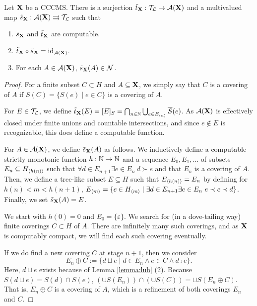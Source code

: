 \documentclass{eptcs-modified}
\begin{document}
\begin{proposition}\label{prop:nicefunctionsgeneral}
Let $\mathbf{X}$ be a CCCMS.
There is a surjection $\tilde{t}_{\mathbf{X}} : \mathcal{T}_\mathcal{L} \to {\mathcal{A}}(\mathbf{X})$ and a multivalued map $\tilde{s}_{\mathbf{X}}: {\mathcal{A}}(\mathbf{X}) \rightrightarrows \mathcal{T}_\mathcal{L}$ such that
\begin{enumerate}
\item $\tilde{s}_{\mathbf{X}}$ and $\tilde{t}_{\mathbf{X}}$ are computable.
\item $\tilde{t}_{\mathbf{X}} \circ \tilde{s}_{\mathbf{X}} = \textnormal{id}_{\mathcal{A}(\mathbf{X})}$.
\item For each $A \in {\mathcal{A}}(\mathbf{X})$, $\tilde{s}_{\mathbf{X}}(A) \in \mathcal{N}$.
\end{enumerate}

\begin{proof}
For a finite subset $C \subset H$ and $A \subseteq \mathbf{X}$, we simply say that $C$ is a covering of $A$ if
$S(C) = \{S(e) \mid e \in C\}$ is a covering of $A$.

For $E \in \mathcal{T}_\mathcal{L}$, we define $\tilde{t}_{\mathbf{X}}(E) = [E]_S =
\bigcap_{n \in \mathbb{N}} \bigcup_{e \in {{E_{{\langle n\rangle}}}}} \overline{S}(e)$.
As $\mathcal{A}(\mathbf{X})$ is effectively closed under finite unions and countable intersections,
and since $e \notin E$ is recognizable, this does define a computable function.

For $A \in \mathcal{A}(\mathbf{X})$, we define $\tilde{s}_{\mathbf{X}}(A)$ as follows.
We inductively define a computable strictly monotonic function $h : \mathbb{N} \to \mathbb{N}$ and
a sequence $E_0,E_1,\ldots$ of subsets $E_n \subseteq {{H_{{\langle h(n)\rangle}}}}$ such that
$\forall d \in E_{n+1} \exists  e \in E_{n} \ d \succ e $ and that
$E_n$ is a covering of $A$.
Then, we define a tree-like subset $E \subseteq H$ such that
${{E_{{\langle h(n)\rangle}}}} = E_n$ by defining for $h(n) < m < h(n+1)$,
${{E_{{\langle m\rangle}}}} =
\{c \in {{H_{{\langle m\rangle}}}} \mid \exists d \in E_{n+1} \exists  e \in E_{n} \ e \prec c \prec d\}$. Finally, we set $\tilde{s}_{\mathbf{X}}(A) = E$.



We start with $h(0) = 0$ and $E_0 = \{\varepsilon\}$.
We search for (in a dove-tailing way) finite coverings $C \subset H$ of $A$.
There are infinitely many such coverings, and
as $\mathbf{X}$ is computably compact, we will find each such covering eventually.

If we do find a new covering $C$ at stage $n+1$, then we consider
$$E_n \oplus C := \{ d \sqcup e \mid d \in E_n \wedge e \in C \wedge d \comp e\}.$$  Here,  $d \sqcup e$ exists because of Lemma \ref{lemma:lub} (2).
Because $S(d \sqcup e) = S(d) \cap S(e)$,
$(\cup S(E_n)) \cap (\cup S(C)) = \cup S(E_n \oplus C)$.  That is,  $E_n \oplus C$ is
a covering of $A$, which is a refinement of both coverings $E_n$ and $C$.



\end{proof}
\end{proposition}
\end{document}

